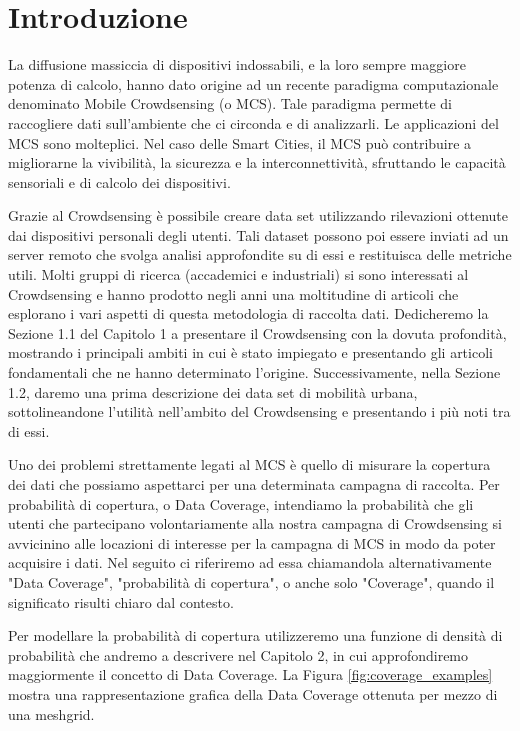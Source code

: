 \chapter*{Introduzione}

La diffusione massiccia di dispositivi indossabili, e la loro sempre maggiore potenza di calcolo, hanno dato origine ad un recente paradigma computazionale denominato Mobile Crowdsensing (o MCS). Tale paradigma permette di raccogliere dati sull'ambiente che ci circonda e di analizzarli. Le applicazioni del MCS sono molteplici. Nel caso delle Smart Cities, il MCS può contribuire a migliorarne la vivibilità, la sicurezza e la interconnettività, sfruttando le capacità sensoriali e di calcolo dei dispositivi.

Grazie al Crowdsensing è possibile creare data set utilizzando rilevazioni ottenute dai dispositivi personali degli utenti. Tali dataset possono poi essere inviati ad un server remoto che svolga analisi approfondite su di essi e restituisca delle metriche utili.
Molti gruppi di ricerca (accademici e industriali) si sono interessati al Crowdsensing e hanno prodotto negli anni una moltitudine di articoli che esplorano i vari aspetti di questa metodologia di raccolta dati. Dedicheremo la Sezione 1.1 del Capitolo 1 a presentare il Crowdsensing con la dovuta profondità, mostrando i principali ambiti in cui è stato impiegato e presentando gli articoli fondamentali che ne hanno determinato l'origine.
Successivamente, nella Sezione 1.2, daremo una prima descrizione dei data set di mobilità urbana, sottolineandone l'utilità nell'ambito del Crowdsensing e presentando i più noti tra di essi. 


Uno dei problemi strettamente legati al MCS è quello di misurare la copertura dei dati che possiamo aspettarci per una determinata campagna di raccolta.
Per probabilità di copertura, o Data Coverage, intendiamo la probabilità che gli utenti che partecipano volontariamente alla nostra campagna di Crowdsensing si avvicinino alle locazioni di interesse per la campagna di MCS in modo da poter acquisire i dati.
Nel seguito ci riferiremo ad essa chiamandola alternativamente "Data Coverage", "probabilità di copertura", o anche solo "Coverage", quando il significato risulti chiaro dal contesto.

 Per modellare la probabilità di copertura utilizzeremo una funzione di densità di probabilità che andremo a descrivere nel Capitolo 2, in cui approfondiremo maggiormente il concetto di Data Coverage.
  La Figura \ref{fig:coverage_examples} mostra una rappresentazione grafica della Data Coverage ottenuta per mezzo di una meshgrid.
  
